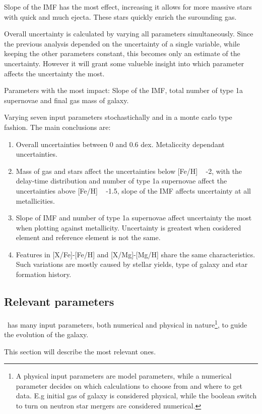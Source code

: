 Slope of the IMF has the most effect, increasing it allows for more massive stars with quick and much ejecta.
These stars quickly enrich the surounding gas.

Overall uncertainty is calculated by varying all parameters simultaneously.
Since the previous analysis depended on the uncertainty of a single variable, while keeping the other parameters constant,
this becomes only an estimate of the uncertainty. However it will grant some valueble insight into which parameter affects
the uncertainty the most.

Parameters with the most impact: Slope of the IMF, total number of type 1a supernovae and final gas mass of galaxy.

Varying seven input parameters stochastichally and in a monte carlo type fashion.
The main conclusions are:
\begin{enumerate}
\item{Overall uncertainties between 0 and 0.6 dex. Metaliccity dependant uncertainties.}
\item{Mass of gas and stars affect the uncertainties below [Fe/H] ~ -2,
  with the delay-time distribution and number of type 1a supernovae affect the uncertainties above [Fe/H] ~ -1.5,
  slope of the IMF affects uncertainty at all metallicities.}
\item{Slope of IMF and number of type 1a supernovae affect uncertainty the most when plotting against metallicity.
  Uncertainty is greatest when cosidered element and reference element is not the same. }
\item{Features in [X/Fe]-[Fe/H] and [X/Mg]-[Mg/H] share the same characteristics. Such variations
  are mostly caused by stellar yields, type of galaxy and star formation history.}
\end{enumerate}


\subsection{Relevant parameters}
\label{sec:omega-parameters}
\omegamodel\ has many input parameters, both numerical and physical in nature\footnote{A physical input parameters are model parameters, while a numerical parameter decides on which calculations to choose from and where to get data. E.g initial gas of galaxy is considered physical, while the boolean switch to turn on neutron star mergers are considered numerical.}, to guide the evolution of the galaxy.

This section will describe the most relevant ones.

